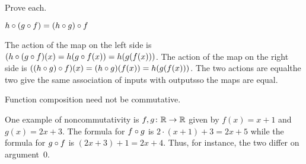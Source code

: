 \documentclass{ibl}  %
\begin{document}
\begin{problem} Prove each.
\begin{exes}
\begin{exercise}
  $h\mathbin{\circ} (g\mathbin{\circ} f)=(h\mathbin{\circ} g)\mathbin{\circ} f$    
\end{exercise}
\begin{answer}
  The action of the map on the left side
  is $(h\mathbin{\circ} (g\mathbin{\circ} f)(x)=h(g\mathbin{\circ} f(x))
       =h(g(f(x)))$.
  The action of the map on the right side  
  is $((h\mathbin{\circ} g)\mathbin{\circ} f)(x)=(h\mathbin{\circ} g)(f(x))
      =h(g(f(x)))$.
  The two actions are equal\Dash the two give the same association of inputs
  with outputs\Dash so the maps are equal.  
\end{answer}
\begin{exercise} 
  Function composition need not be commutative.
\end{exercise}
\begin{answer}
  One example of noncommutativity is $\mbox{$f,g\colon \mathbb{R}\to \mathbb{R}$}$ given by 
  $f(x)=x+1$ and $g(x)=2x+3$.
  The formula for $f\mathbin{\circ} g$ is $2\cdot(x+1)+3=2x+5$ while
  the formula for $g\mathbin{\circ} f$ is $(2x+3)+1=2x+4$.
  Thus, for instance, the two differ on argument~$0$.  
\end{answer}
\end{exes}
\end{problem}
\end{document}

